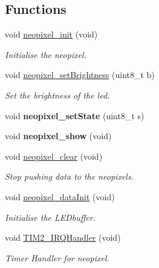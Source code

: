 \subsection*{Functions}
\begin{DoxyCompactItemize}
\item 
void \hyperlink{group___neo_pixel_gaac78468985e44a3e4d353ea9276b33bc}{neopixel\+\_\+init} (void)
\begin{DoxyCompactList}\small\item\em Initialise the neopixel. \end{DoxyCompactList}\item 
void \hyperlink{group___neo_pixel_gae027558106eef5c81996294f4561fecb}{neopixel\+\_\+set\+Brightness} (uint8\+\_\+t b)
\begin{DoxyCompactList}\small\item\em Set the brightness of the led. \end{DoxyCompactList}\item 
\mbox{\label{group___neo_pixel_gada44b0356745943702c92d394760cd3e}} 
void {\bfseries neopixel\+\_\+set\+State} (uint8\+\_\+t s)
\item 
\mbox{\label{group___neo_pixel_gadb692027c25b23852a28f2ca43dc2399}} 
void {\bfseries neopixel\+\_\+show} (void)
\item 
void \hyperlink{group___neo_pixel_ga8e3cfef785ce221672f825f8785c25b8}{neopixel\+\_\+clear} (void)
\begin{DoxyCompactList}\small\item\em Stop pushing data to the neopixels. \end{DoxyCompactList}\item 
void \hyperlink{group___neo_pixel_ga79e34feddcfb2c45ae218166c84bdff4}{neopixel\+\_\+data\+Init} (void)
\begin{DoxyCompactList}\small\item\em Initialise the L\+E\+Dbuffer. \end{DoxyCompactList}\item 
void \hyperlink{group___neo_pixel_ga38ad4725462bdc5e86c4ead4f04b9fc2}{T\+I\+M2\+\_\+\+I\+R\+Q\+Handler} (void)
\begin{DoxyCompactList}\small\item\em Timer Handler for neopixel. \end{DoxyCompactList}\item 
\mbox{\label{group___neo_pixel_ga40253bdc59873753452f3179a8ee1762}} 

\end{DoxyCompactItemize}
